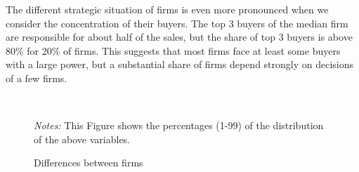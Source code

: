 \documentclass[final, dvipsnames, authoryear,12pt]{elsarticle}
\begin{document}
The different strategic situation of firms is even more pronounced when we consider the concentration of their buyers. The top 3 buyers of the median firm are responsible for about half of the sales, but the share of top 3 buyers is above 80\% for 20\% of firms. This suggests that most firms face at least some buyers with a large power, but a substantial share of firms depend strongly on decisions of a few firms.

\begin{figure}[!h]
    \caption{Differences between firms}
    \label{fig:happy_few}
    \begin{center}
    \\
    \end{center}    
        {\footnotesize \textit{Notes:} This Figure shows the percentages (1-99) of the distribution of the above variables.} 
\end{figure}
\restoregeometry
\end{document}

